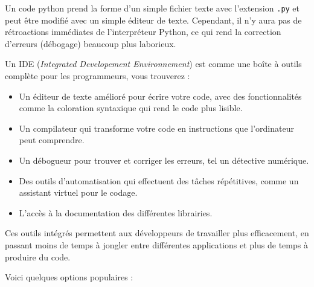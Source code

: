 \documentclass[
  11pt,
  letterpaper,
  open=any,
  twoside=false,
  french]{scrbook}
\begin{document}
Un code python prend la forme d'un simple fichier texte avec l'extension
\texttt{.py} et peut être modifié avec un simple éditeur de texte.
Cependant, il n'y aura pas de rétroactions immédiates de l'interpréteur
Python, ce qui rend la correction d'erreurs (débogage) beaucoup plus
laborieux.

Un IDE (\emph{Integrated Developement Environnement}) est comme une
boîte à outils complète pour les programmeurs, vous trouverez :

\begin{itemize}
\item
  Un éditeur de texte amélioré pour écrire votre code, avec des
  fonctionnalités comme la coloration syntaxique qui rend le code plus
  lisible.
\item
  Un compilateur qui transforme votre code en instructions que
  l'ordinateur peut comprendre.
\item
  Un débogueur pour trouver et corriger les erreurs, tel un détective
  numérique.
\item
  Des outils d'automatisation qui effectuent des tâches répétitives,
  comme un assistant virtuel pour le codage.
\item
  L'accès à la documentation des différentes librairies.
\end{itemize}

Ces outils intégrés permettent aux développeurs de travailler plus
efficacement, en passant moins de temps à jongler entre différentes
applications et plus de temps à produire du code.

Voici quelques options populaires :
\end{document}
